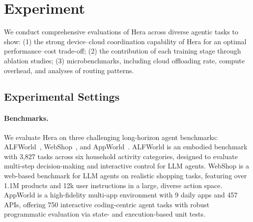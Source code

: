 \documentclass{article}
\newcommand{\name}{Hera\xspace}
\begin{document}
\section{Experiment}
\label{sec:exp}

\vspace{-.5em}
We conduct comprehensive evaluations of \name across diverse agentic tasks to show:
(1) the strong device--cloud coordination capability of \name for an optimal performance--cost trade-off;
(2) the contribution of each training stage through ablation studies;
(3) microbenchmarks, including cloud offloading rate, compute overhead, and analyses of routing patterns.

\vspace{-.5em}
\subsection{Experimental Settings}
\label{subsec:exp_set}

\vspace{-.5em}
\paragraph{Benchmarks.}
We evaluate \name on three challenging long-horizon agent benchmarks:
ALFWorld~\citep{ALFWorld20}, WebShop~\citep{yao2022webshop}, and AppWorld~\citep{appworld}.
ALFWorld is an embodied benchmark with 3,827 tasks across six household activity categories, designed to evaluate multi-step decision-making and interactive control for LLM agents.
WebShop is a web-based benchmark for LLM agents on realistic shopping tasks, featuring over 1.1M products and 12k user instructions in a large, diverse action space.
AppWorld is a high-fidelity multi-app environment with 9 daily apps and 457 APIs, offering 750 interactive coding-centric agent tasks with robust programmatic evaluation via state- and execution-based unit tests.
\end{document}
